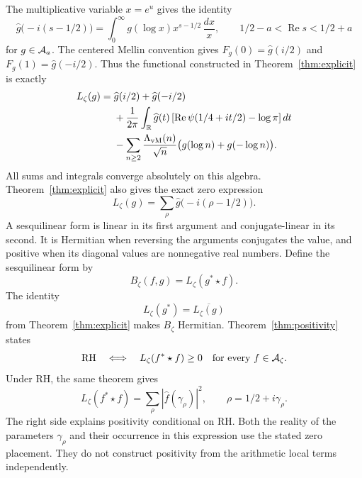 The multiplicative variable $x=e^u$ gives the identity
\begin{equation}
 \widehat g\bigl(-i(s-1/2)\bigr)
 =\int_0^\infty g(\log x)x^{s-1/2}\,\frac{dx}{x},
 \qquad 1/2-a<\operatorname{Re}s<1/2+a
 \label{eq:mellin}
\end{equation}
for $g\in\mathcal A_a$.
The centered Mellin convention gives
$F_g(0)=\widehat g(i/2)$ and $F_g(1)=\widehat g(-i/2)$.
Thus the functional constructed in Theorem~\ref{thm:explicit} is exactly
\begin{equation}
\begin{split}
 L_\zeta(g)={}&\widehat g(i/2)+\widehat g(-i/2)\\
 &+\frac1{2\pi}\int_{\mathbb R}\widehat g(t)
   \left[\operatorname{Re}\psi(1/4+it/2)-\log\pi\right]dt\\
 &-\sum_{n\geq2}\frac{\Lambda_{\rm vM}(n)}{\sqrt n}
                 \bigl(g(\log n)+g(-\log n)\bigr).
\end{split}
\label{eq:weil-functional}
\end{equation}
All sums and integrals converge absolutely on this algebra.
Theorem~\ref{thm:explicit} also gives the exact zero expression
\begin{equation}
 L_\zeta(g)=\sum_\rho\widehat g\bigl(-i(\rho-1/2)\bigr).
 \label{eq:explicit}
\end{equation}
A sesquilinear form is linear in its first argument and conjugate-linear in
its second.  It is Hermitian when reversing the arguments conjugates the
value, and positive when its diagonal values are nonnegative real numbers.
Define the sesquilinear form by
\[
 B_\zeta(f,g)=L_\zeta(g^*\star f).
\]
The identity
\begin{equation}
 L_\zeta(g^*)=\overline{L_\zeta(g)}
 \label{eq:hermitian}
\end{equation}
from Theorem~\ref{thm:explicit} makes $B_\zeta$ Hermitian.
Theorem~\ref{thm:positivity} states
\begin{equation}
 \mathrm{RH}\quad\Longleftrightarrow\quad
 L_\zeta(f^*\star f)\geq0\quad\hbox{for every }f\in\mathcal A_\zeta.
 \label{eq:weil-criterion}
\end{equation}
Under RH, the same theorem gives
\begin{equation}
 L_\zeta(f^*\star f)=\sum_\rho|\widehat f(\gamma_\rho)|^2,
 \qquad \rho=1/2+i\gamma_\rho.
 \label{eq:zero-norm}
\end{equation}
The right side explains positivity conditional on RH.  Both the reality
of the parameters $\gamma_\rho$ and their occurrence in this expression
use the stated zero placement.  They do not construct positivity from the
arithmetic local terms independently.

